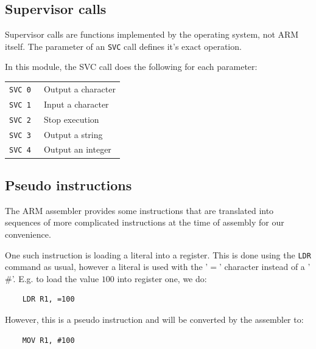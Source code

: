 
\subsection{Supervisor calls}

Supervisor calls are functions implemented by the operating system, not ARM
itself. The parameter of an {\tt SVC} call defines it's exact
operation.


In this module, the SVC call does the following for each parameter:

\begin{tabularx}{\textwidth}{l X}
	{\tt SVC 0 } & Output a character \\
	{\tt SVC 1 } & Input a character \\
	{\tt SVC 2 } & Stop execution \\
	{\tt SVC 3 } & Output a string \\
	{\tt SVC 4 } & Output an integer \\
\end{tabularx}

\subsection{Pseudo instructions}

The ARM assembler provides some instructions that are translated into sequences
of more complicated instructions at the time of assembly for our convenience.

One such instruction is loading a literal into a register. This is done using
the {\tt LDR} command as usual, however a literal is used with the '$=$'
character instead of a '$\#$'. E.g. to load the value $100$ into register one,
we do:

\begin{verbatim}
	LDR	R1,	=100
\end{verbatim}

However, this is a pseudo instruction and will be converted by the assembler to:

\begin{verbatim}
	MOV	R1,	#100
\end{verbatim}

